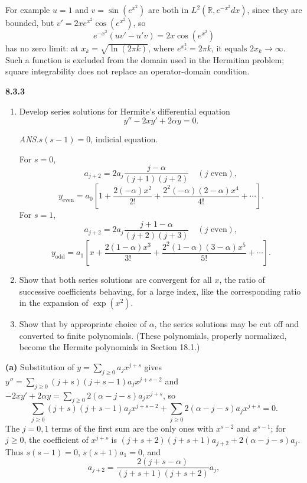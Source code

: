 For example $u=1$ and $v=\sin(e^{x^2})$ are both in
$L^2(\mathbb R,e^{-x^2}dx)$, since they are bounded, but
$v'=2xe^{x^2}\cos(e^{x^2})$, so
\[
e^{-x^2}(uv'-u'v)=2x\cos(e^{x^2})
\]
has no zero limit: at $x_k=\sqrt{\ln(2\pi k)}$, where
$e^{x_k^2}=2\pi k$, it equals $2x_k\to\infty$.
Such a function is excluded from the domain used in the Hermitian
problem; square integrability does not replace an operator-domain
condition.


\par\bigskip
\noindent\textbf{8.3.3}\quad
\begin{enumerate}
\item[(a)] Develop series solutions for Hermite's differential equation
  \[
  y''-2xy'+2\alpha y=0.
  \]
  \par\nobreak\hfill\emph{ANS.}\enspace $s(s-1)=0$, indicial equation.\par
  For $s=0$,
  \[
  a_{j+2}=2a_{j}\frac{j-\alpha}{(j+1)(j+2)}\quad(j\text{ even}),
  \]
  \[
  y_{\mathrm{even}}=a_{0}\left[1+\frac{2(-\alpha)x^{2}}{2!}
  +\frac{2^{2}(-\alpha)(2-\alpha)x^{4}}{4!}+\cdots\right].
  \]
  For $s=1$,
  \[
  a_{j+2}=2a_{j}\frac{j+1-\alpha}{(j+2)(j+3)}\quad(j\text{ even}),
  \]
  \[
  y_{\mathrm{odd}}=a_{1}\left[x+\frac{2(1-\alpha)x^{3}}{3!}
  +\frac{2^{2}(1-\alpha)(3-\alpha)x^{5}}{5!}+\cdots\right].
  \]
\item[(b)] Show that both series solutions are convergent for all $x$, the
  ratio of successive coefficients behaving, for a large index, like the
  corresponding ratio in the expansion of $\exp(x^{2})$.
\item[(c)] Show that by appropriate choice of $\alpha$, the series solutions
  may be cut off and converted to finite polynomials. (These polynomials,
  properly normalized, become the Hermite polynomials in Section 18.1.)
\end{enumerate}
\solution
\textbf{(a)} Substitution of $y=\sum_{j\ge0}a_jx^{j+s}$ gives
$y''=\sum_{j\ge0}(j+s)(j+s-1)a_jx^{j+s-2}$ and
$-2xy'+2\alpha y=\sum_{j\ge0}2(\alpha-j-s)a_jx^{j+s}$, so
\[
\sum_{j\ge0}(j+s)(j+s-1)a_jx^{j+s-2}
+\sum_{j\ge0}2(\alpha-j-s)a_jx^{j+s}=0.
\]
The $j=0,1$ terms of the first sum are the only ones with $x^{s-2}$ and
$x^{s-1}$; for $j\ge0$, the coefficient of $x^{j+s}$ is
$(j+s+2)(j+s+1)a_{j+2}+2(\alpha-j-s)a_j$.
Thus $s(s-1)=0$, $s(s+1)a_1=0$, and
\[
\boxed{a_{j+2}=\frac{2(j+s-\alpha)}{(j+s+1)(j+s+2)}a_j},
\]
